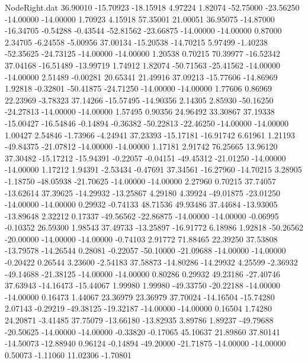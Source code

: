 \begin{filecontents}{NodeRight.dat}
  36.90010  -15.70923  -18.15918     4.97224    1.82074  -52.75000  -23.56250  -14.00000  -14.00000    1.70923    4.15918   57.35001   21.00051
  36.95075  -14.87000  -16.34705    -0.54288   -0.43544  -52.81562  -23.66875  -14.00000  -14.00000    0.87000    2.34705   -6.24558   -5.00956
  37.00134  -15.20538  -14.70215     5.97499   -1.40238  -52.35625  -24.73125  -14.00000  -14.00000    1.20538    0.70215   70.39977  -16.52342
  37.04168  -16.51489  -13.99719     1.74912    1.82074  -50.71563  -25.41562  -14.00000  -14.00000    2.51489   -0.00281   20.65341   21.49916
  37.09213  -15.77606  -14.86969     1.92818   -0.32801  -50.41875  -24.71250  -14.00000  -14.00000    1.77606    0.86969   22.23969   -3.78323
  37.14266  -15.57495  -14.90356     2.14305    2.85930  -50.16250  -24.27813  -14.00000  -14.00000    1.57495    0.90356   24.96492   33.30867
  37.19338  -15.00427  -16.54846    -0.14894   -0.36382  -50.22813  -22.46250  -14.00000  -14.00000    1.00427    2.54846   -1.73966   -4.24941
  37.23393  -15.17181  -16.91742     6.61961    1.21193  -49.84375  -21.07812  -14.00000  -14.00000    1.17181    2.91742   76.25665   13.96120
  37.30482  -15.17212  -15.94391    -0.22057   -0.04151  -49.45312  -21.01250  -14.00000  -14.00000    1.17212    1.94391   -2.53434   -0.47691
  37.34561  -16.27960  -14.70215     3.28905   -1.18750  -48.05938  -21.70625  -14.00000  -14.00000    2.27960    0.70215   37.74057  -13.62614
  37.39625  -14.29932  -13.25867     4.29180    4.39924  -49.01875  -23.01250  -14.00000  -14.00000    0.29932   -0.74133   48.71536   49.93486
  37.44684  -13.93005  -13.89648     2.32212    0.17337  -49.56562  -22.86875  -14.00000  -14.00000   -0.06995   -0.10352   26.59300    1.98543
  37.49733  -13.25897  -16.91772     6.18986    1.92818  -50.26562  -20.00000  -14.00000  -14.00000   -0.74103    2.91772   71.88465   22.39250
  37.53808  -13.79578  -14.26544     0.28081   -0.22057  -50.10000  -21.09688  -14.00000  -14.00000   -0.20422    0.26544    3.23600   -2.54183
  37.58873  -14.80286  -14.29932     4.25599   -2.36932  -49.14688  -21.38125  -14.00000  -14.00000    0.80286    0.29932   49.23186  -27.40746
  37.63943  -14.16473  -15.44067     1.99980    1.99980  -49.33750  -20.22188  -14.00000  -14.00000    0.16473    1.44067   23.36979   23.36979
  37.70024  -14.16504  -15.74280     2.07143   -0.29219  -49.38125  -19.32187  -14.00000  -14.00000    0.16504    1.74280   24.20871   -3.41485
  37.75079  -13.66180  -13.82935     3.89786    1.89237  -49.79688  -20.50625  -14.00000  -14.00000   -0.33820   -0.17065   45.10637   21.89860
  37.80141  -14.50073  -12.88940     0.96124   -0.14894  -49.20000  -21.71875  -14.00000  -14.00000    0.50073   -1.11060   11.02306   -1.70801

\end{filecontents}
